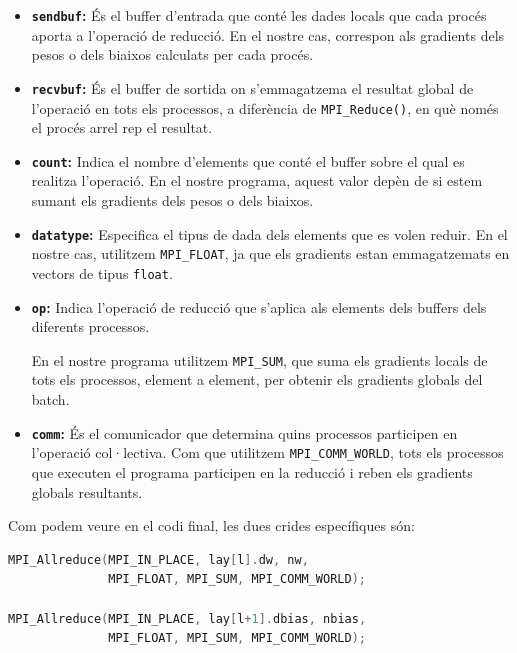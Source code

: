 \documentclass{article}
\begin{document}
\begin{itemize}

    \item \textbf{\texttt{sendbuf}:}
    És el buffer d'entrada que conté les dades locals
    que cada procés aporta a l'operació de reducció.
    En el nostre cas, correspon als gradients dels
    pesos o dels biaixos calculats per cada procés.

    \item \textbf{\texttt{recvbuf}:}
    És el buffer de sortida on s'emmagatzema el
    resultat global de l'operació en tots els processos,
    a diferència de \texttt{MPI\_Reduce()}, en què
    només el procés arrel rep el resultat.

    \item \textbf{\texttt{count}:}
    Indica el nombre d'elements que conté
    el buffer sobre el qual es realitza l'operació.
    En el nostre programa, aquest valor depèn
    de si estem sumant els gradients dels pesos
    o dels biaixos.    

    \item \textbf{\texttt{datatype}:}
    Especifica el tipus de dada dels elements
    que es volen reduir.
    En el nostre cas, utilitzem \texttt{MPI\_FLOAT},
    ja que els gradients estan emmagatzemats en vectors de tipus
    \texttt{float}.

    \item \textbf{\texttt{op}:}
    Indica l'operació de reducció que s'aplica
    als elements dels buffers dels diferents processos.

    En el nostre programa utilitzem
    \texttt{MPI\_SUM}, que suma els gradients locals
    de tots els processos, element a element,
    per obtenir els gradients globals del batch.

    \item \textbf{\texttt{comm}:}
    És el comunicador que determina quins processos
    participen en l'operació col·lectiva. Com que utilitzem
    \texttt{MPI\_COMM\_WORLD}, tots els processos que executen el programa participen en la reducció i reben
    els gradients globals resultants.

    \medskip
\end{itemize} 

    
Com podem veure en el codi final, les dues crides específiques són:

\begin{lstlisting}[language=C]
MPI_Allreduce(MPI_IN_PLACE, lay[l].dw, nw,
              MPI_FLOAT, MPI_SUM, MPI_COMM_WORLD);

MPI_Allreduce(MPI_IN_PLACE, lay[l+1].dbias, nbias,
              MPI_FLOAT, MPI_SUM, MPI_COMM_WORLD);
\end{lstlisting}
\end{document}
